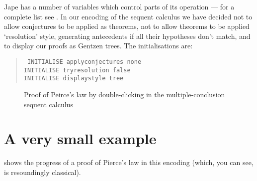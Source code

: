 Jape has a number of variables which control parts of its operation --- for a complete list see . In our encoding of the sequent calculus we have decided not to allow conjectures to be applied as theorems, not to allow theorems to be applied `resolution' style, generating antecedents if all their hypotheses don't match, and to display our proofs as Gentzen trees. The initialisations are:

\begin{quote}\tt\small
INITIALISE applyconjectures none\\
INITIALISE tryresolution false\\
INITIALISE displaystyle tree
\end{quote}

\begin{figure}
\centering
{}\qquad
{}\qquad
{}\qquad
{}\qquad
\caption{Proof of Peirce's law by double-clicking in the multiple-conclusion sequent calculus}
\label{fig:peirce}
\end{figure}


\section{A very small example}

 shows the progress of a proof of Pierce's law in this encoding (which, you can see, is resoundingly classical).
